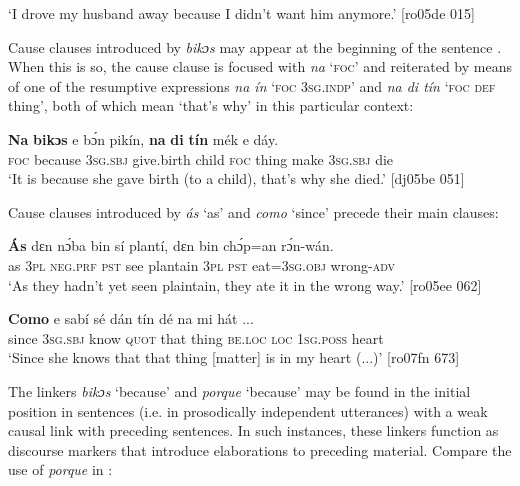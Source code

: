 \glt  ‘I drove my husband away because I didn’t want him anymore.’ [ro05de 015]
\z

Cause clauses introduced by \textit{bikɔs} may appear at the beginning of the sentence . When this is so, the cause clause is focused with \textit{na} ‘\textsc{foc}’ and reiterated by means of one of the resumptive expressions \textit{na ín} ‘\textsc{foc} \textsc{3sg.indp}’ and \textit{na di tín} ‘\textsc{foc} \textsc{def} thing’, both of which mean ‘that’s why’ in this particular context:


\ea%
    \label{ex:key:1505}
    \gll \textbf{Na}  \textbf{bikɔs}  e    bɔ́n      pikín,  \textbf{na}  \textbf{di}  \textbf{tín} 
mék    e    dáy.\\
\textsc{foc} because \textsc{3sg.sbj} give.birth  child  \textsc{foc} thing make  \textsc{3sg.sbj}  die\\

\glt ‘It is because she gave birth (to a child), that’s why she died.’ [dj05be 051]
\z

Cause clauses introduced by \textit{ás} ‘as’  and \textit{como} ‘since’  precede their main clauses:


\ea%
    \label{ex:key:1506}
    \gll \textbf{\'{A}s}  dɛn  nɔ́ba  bin  sí  plantí,  dɛn  bin  chɔ́p=an    rɔ́n-wán.\\
as  \textsc{3pl}  \textsc{neg}.\textsc{prf}  \textsc{pst}  see  plantain  \textsc{3pl}  \textsc{pst}  eat=\textsc{3sg.obj}  wrong\textsc{{}-adv}\\

\glt ‘As they hadn’t yet seen plaintain, they ate it in the wrong way.’ [ro05ee 062]
\z


\ea%
    \label{ex:key:1507}
    \gll \textbf{Como}  e    sabí    sé    dán  tín    dé    na  mi    hát  \op...\cp{}\\
since  \textsc{3sg.sbj}  know  \textsc{quot}    that  thing  \textsc{be.loc}  \textsc{loc}  \textsc{1sg.poss}  heart\\

\glt ‘Since she knows that that thing [matter] is in my heart (...)’ [ro07fn 673]
\z

The linkers\textit{ bikɔs} ‘because’ and \textit{porque} ‘because’ may be found in the initial position in sentences (i.e. in prosodically independent utterances) with a weak causal link with preceding sentences. In such instances, these linkers function as discourse markers that introduce elaborations to preceding material. Compare the use of \textit{porque} in :


